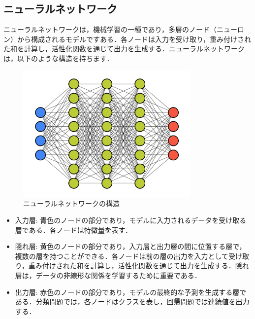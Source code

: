 
\subsection{ニューラルネットワーク}
ニューラルネットワークは，機械学習の一種であり，多層のノード（ニューロン）から構成されるモデルですある．各ノードは入力を受け取り，重み付けされた和を計算し，活性化関数を通じて出力を生成する\cite{book-deeplearning}．ニューラルネットワークは，以下のような構造を持ちます．

\begin{figure}[H]
    \centering
    \includegraphics[width=0.8\textwidth]{images/struc_NN.png}
    \caption{ニューラルネットワークの構造}
    \label{fig:adversarial_learning1}
\end{figure}

\begin{itemize}
    \item 入力層: 青色のノードの部分であり，モデルに入力されるデータを受け取る層である．各ノードは特徴量を表す．
    \item 隠れ層: 黄色のノードの部分であり，入力層と出力層の間に位置する層で，複数の層を持つことができる．各ノードは前の層の出力を入力として受け取り，重み付けされた和を計算し，活性化関数を通じて出力を生成する．隠れ層は，データの非線形な関係を学習するために重要である．
    \item 出力層: 赤色のノードの部分であり，モデルの最終的な予測を生成する層である．分類問題では，各ノードはクラスを表し，回帰問題では連続値を出力する．
\end{itemize}

